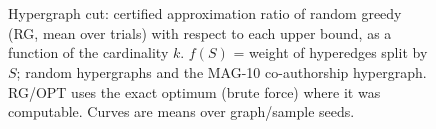 \begin{figure}[t]
\centering
\setlength{\rgplotwidth}{0.49\columnwidth}
\\[1pt]
\hfill
\\

\caption{Hypergraph cut: certified approximation ratio of random greedy (RG, mean over trials) with respect to each upper bound, as a function of the cardinality $k$. $f(S)$ = weight of hyperedges split by $S$; random hypergraphs and the MAG-10 co-authorship hypergraph. RG/OPT uses the exact optimum (brute force) where it was computable. Curves are means over graph/sample seeds.}
\label{fig:rg-hypergraph_cut}
\end{figure}

